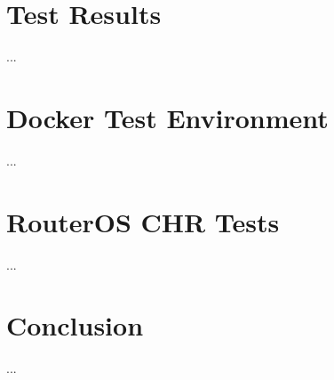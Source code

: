 \documentclass[binding=0.6cm,noexaminfo]{sapthesis}
\begin{document}
\chapter{Test Results} ...
\chapter{Docker Test Environment} ...
\chapter{RouterOS CHR Tests} ...
\chapter{Conclusion} ...
\backmatter
\cleardoublepage
{} %
\end{document}
